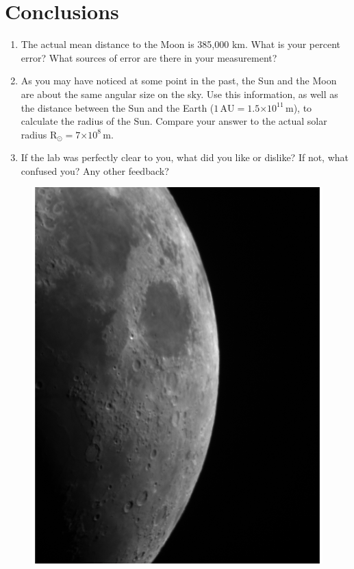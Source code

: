\documentclass[12pt]{article}%
\providecommand{\e}[1]{\ensuremath{\times 10^{#1}}} %
\begin{document}
\section{Conclusions}
\begin{enumerate}
    \item The actual mean distance to the Moon is 385,000 km. What is your percent error? What sources of error are there in your measurement?
    
    
    \item As you may have noticed at some point in the past, the Sun and the Moon are about the same angular size on the sky. 
    Use this information, as well as the distance between the Sun and the Earth ($1 \, \mathrm{AU} = 1.5 \e{11} \, \mathrm{m}$), to calculate the radius of the Sun. 
    Compare your answer to the actual solar radius $\mathrm{R}_{\odot} = 7 \e{8} \, \mathrm{m}$.


    \item If the lab was perfectly clear to you, what did you like or dislike? If not, what confused you? Any other feedback?
\end{enumerate}





\begin{figure}[htb!]
\center
\includegraphics[width=15cm]{moon_single.pdf}
\end{figure}
\end{document}
